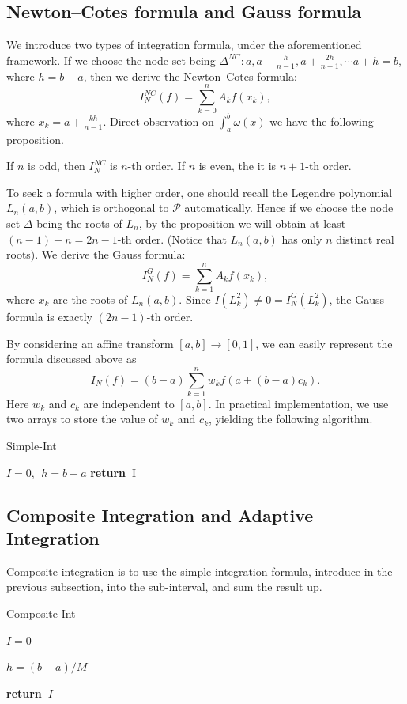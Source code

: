 \documentclass{article}
\newcommand{\return}{\textbf{return~}}
\begin{document}
\subsection{Newton--Cotes formula and Gauss formula}
We introduce two types of integration formula, under the aforementioned framework. If we choose the node set being $\Delta^{NC} : a, a+\frac{h}{n-1}, a+\frac{2h}{n-1}, \cdots a + h=b$, where $h = b-a$, then we derive the Newton--Cotes formula:
$$I_N^{NC}(f) = \sum_{k=0}^{n} A_k f(x_k),$$
where $x_k = a + \frac{kh}{n-1}$. 
Direct observation on $\int_a^b \omega(x)$ we have the following proposition.

\begin{proposition}
	If $n$ is odd, then $I_N^{NC}$ is $n$-th order. If $n$ is even, the it is $n+1$-th order.
\end{proposition}

To seek a formula with higher order, one should recall the Legendre polynomial $L_n(a,b)$, which is orthogonal to $\mathcal P$ automatically. Hence if we choose the node set $\Delta$ being the roots of $L_n$, by the proposition we will obtain at least $(n-1) + n =2n-1$-th order. (Notice that $L_n(a,b)$ has only $n$ distinct real roots). We derive the Gauss formula:
$$I_N^{G}(f) = \sum_{k=1}^{n} A_k f(x_k),$$
where $x_k$ are the roots of $L_n(a,b)$. Since $I(L_k^2)\neq 0 = I_N^G(L_k^2)$, the Gauss formula is exactly $(2n-1)$-th order.

By considering an affine transform $[a,b] \to [0,1]$, we can easily represent the formula discussed above as
$$I_N(f) = (b-a)\sum_{k = 1}^{n} w_kf(a + (b-a)c_k).$$ Here $w_k$ and $c_k$ are independent to $[a,b]$. In practical implementation, we use two arrays to store the value of $w_k$ and $c_k$, yielding the following algorithm.

\begin{algorithm}
	\caption{Simple-Int}
$I = 0, ~~ h = b-a$
\return I
\end{algorithm}


\subsection{Composite Integration and Adaptive Integration}
Composite integration is to use the simple integration formula, introduce in the previous subsection, into the sub-interval, and sum the result up.
\begin{algorithm}
	\caption{Composite-Int}
	\DontPrintSemicolon
	$I = 0$
	
	$h = (b-a)/M$

\return $I$
	
\end{algorithm}
\end{document}
